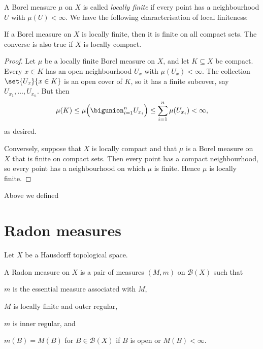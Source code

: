 \documentclass[article, a4paper, 11pt, oneside]{memoir}
\numberwithin{equation}{chapter}
\newcommand{\calB}{\mathcal{B}}
\newcommand{\borel}[1]{\calB(#1)}
\begin{document}
A Borel measure $\mu$ on $X$ is called \emph{locally finite} if every point has a neighbourhood $U$ with $\mu(U) < \infty$. We have the following characterisation of local finiteness:

\begin{proposition}
    \label{thm:local-finiteness-compacts}
    If a Borel measure on $X$ is locally finite, then it is finite on all compact sets. The converse is also true if $X$ is locally compact.
\end{proposition}

\begin{proof}
    Let $\mu$ be a locally finite Borel measure on $X$, and let $K \subseteq X$ be compact. Every $x \in K$ has an open neighbourhood $U_x$ with $\mu(U_x) < \infty$. The collection $\set{U_x}{x \in K}$ is an open cover of $K$, so it has a finite subcover, say $U_{x_1}, \ldots, U_{x_n}$. But then
    \begin{equation*}
        \mu(K)
            \leq \mu \Bigl( \bigunion_{i=1}^n U_{x_i} \Bigr)
            \leq \sum_{i=1}^n \mu(U_{x_i})
            < \infty,
    \end{equation*}
    as desired.

    Conversely, suppose that $X$ is locally compact and that $\mu$ is a Borel measure on $X$ that is finite on compact sets. Then every point has a compact neighbourhood, so every point has a neighbourhood on which $\mu$ is finite. Hence $\mu$ is locally finite.
\end{proof}

Above we defined 



\chapter{Radon measures}

Let $X$ be a Hausdorff topological space.

\begin{definition}
    A Radon measure on $X$ is a pair of measures $(M,m)$ on $\borel{X}$ such that
    \begin{enumdef}
        \item $m$ is the essential measure associated with $M$,

        \item $M$ is locally finite and outer regular,

        \item $m$ is inner regular, and

        \item $m(B) = M(B)$ for $B \in \borel{X}$ if $B$ is open or $M(B) < \infty$.
    \end{enumdef}
\end{definition}
\end{document}
